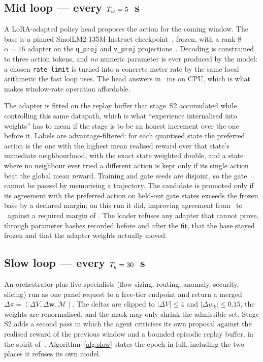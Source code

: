 \documentclass[conference]{IEEEtran}
\newcommand{\dpi}{\Delta\pi}
\newcommand{\wvec}{\mathbf{w}}
\begin{document}
\subsection{Mid loop --- every $T_w=5$~s}
A LoRA-adapted policy head proposes the action for the coming window. The base is a
pinned SmolLM2-135M-Instruct checkpoint~\cite{allal2025smollm2}, frozen, with a rank-8
$\alpha{=}16$ adapter on the \texttt{q\_proj} and \texttt{v\_proj}
projections~\cite{hu2022lora}. Decoding is constrained to three action tokens, and
\emph{no} numeric parameter is ever produced by the model: a chosen
\texttt{rate\_limit} is turned into a concrete meter rate by the same local
arithmetic the fast loop uses. The head answers in \ResThreeCtrl~ms on CPU, which is
what makes window-rate operation affordable.

The adapter is fitted on the replay buffer that stage~S2 accumulated while
controlling this same datapath, which is what ``experience internalised into
weights'' has to mean if the stage is to be an honest increment over the one
before it. Labels are advantage-filtered: for each quantised state the preferred
action is the one with the highest mean realised reward over that state's
immediate neighbourhood, with the exact state weighted double, and a state where
no neighbour ever tried a different action is kept only if its single action beat
the global mean reward. Training and gate seeds are disjoint, so the gate cannot
be passed by memorising a trajectory. The candidate is promoted only if its
agreement with the preferred action on held-out gate states exceeds the frozen
base by a declared margin; on this run it did, improving agreement from
\ResAdapterBase\ to \ResAdapterCandidate\ against a required margin of
\ResAdapterMargin. The loader refuses any adapter that cannot prove, through
parameter hashes recorded before and after the fit, that the base stayed frozen
and that the adapter weights actually moved.

\subsection{Slow loop --- every $T_g=30$~s}
An orchestrator plus five specialists (flow sizing, routing, anomaly, security,
slicing) run as one panel request to a free-tier endpoint and return a merged
$\dpi=(\Delta V,\Delta\wvec,\mathcal{M})$. The deltas are clipped to
$|\Delta V|\le4$ and $|\Delta w_k|\le0.15$, the weights are renormalised, and the
mask may only shrink the admissible set. Stage S2 adds a second pass in which the
agent criticises its own proposal against the realised reward of the previous
window and a bounded episodic replay buffer, in the spirit
of~\cite{shinn2023reflexion,araujo2024agentic}. Algorithm~\ref{alg:slow} states the
epoch in full, including the two places it refuses its own model.
\end{document}
